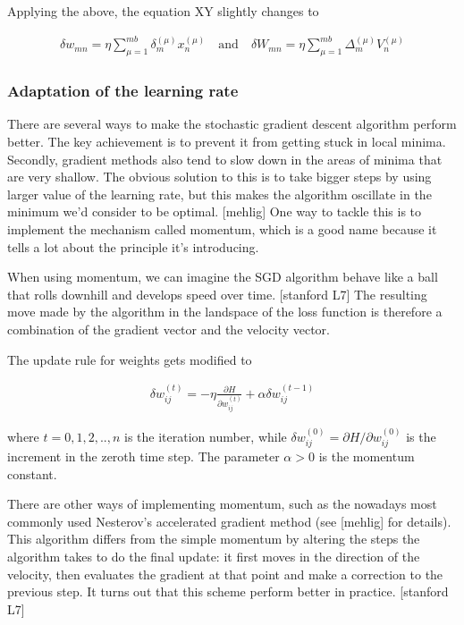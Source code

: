 Applying the above, the equation XY slightly changes to

\begin{gather}
\delta w_{mn} = \eta \sum\limits_{\mu=1}^{mb} \delta_{m}^{(\mu)} x_{n}^{(\mu)}
\quad \text{and} \quad 
\delta W_{mn} = \eta \sum\limits_{\mu=1}^{mb} \Delta_{m}^{(\mu)} V_{n}^{(\mu)}	
\end{gather}

\subsubsection{Adaptation of the learning rate}

There are several ways to make the stochastic gradient descent algorithm perform better. The key achievement is to prevent it from getting stuck in local minima. Secondly, gradient methods also tend to slow down in the areas of minima that are very shallow. The obvious solution to this is to take bigger steps by using larger value of the learning rate, but this makes the algorithm oscillate in the minimum we'd consider to be optimal. [mehlig] One way to tackle this is to implement the mechanism called momentum, which is a good name because it tells a lot about the principle it's introducing. 

When using momentum, we can imagine the SGD algorithm behave like a ball that rolls downhill and develops speed over time. [stanford L7] The resulting move made by the algorithm in the landspace of the loss function is therefore a combination of the gradient vector and the velocity vector. 

\noindent The update rule for weights gets modified to

\begin{gather}
\delta w_{ij}^{(t)} = - \eta \frac{\partial H}{\partial w_{ij}^{(t)}} + \alpha \delta w_{ij}^{(t-1)} 
\end{gather}

\noindent where $ t=0,1,2,..,n $ is the iteration number, while $ \delta w_{ij}^{(0)} = \partial H / \partial w_{ij}^{(0)} $ is the increment in the zeroth time step. The parameter $ \alpha > 0$ is the momentum constant. 

There are other ways of implementing momentum, such as the nowadays most commonly used Nesterov's accelerated gradient method (see [mehlig] for details). This algorithm differs from the simple momentum by altering the steps the algorithm takes to do the final update: it first moves in the direction of the velocity, then evaluates the gradient at that point and make a correction to the previous step. It turns out that this scheme perform better in practice. [stanford L7]

